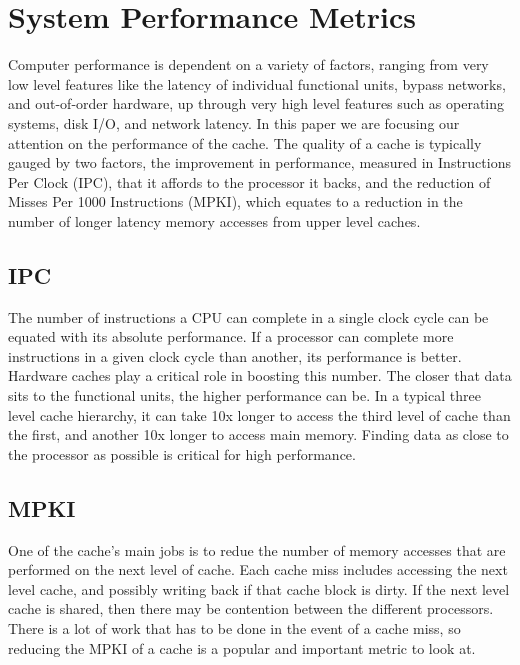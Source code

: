 \section{System Performance Metrics}

Computer performance is dependent on a variety of factors,
 ranging from very low level features like the latency of individual functional units,
 bypass networks, and out-of-order hardware, up through very high level features such as operating systems,
 disk I/O, and network latency. 
In this paper we are focusing our attention on the performance of the cache.
The quality of a cache is typically gauged by two factors,
 the improvement in performance, measured in Instructions Per Clock (IPC),
 that it affords to the processor it backs, and the reduction of Misses Per 1000 Instructions (MPKI),
 which equates to a reduction in the number of longer latency memory accesses from upper level caches.

\subsection{IPC}

The number of instructions a CPU can complete in a single clock cycle can be equated with its absolute performance.
If a processor can complete more instructions in a given clock cycle than another, its performance is better.
Hardware caches play a critical role in boosting this number.
The closer that data sits to the functional units, the higher performance can be.
In a typical three level cache hierarchy, it can take 10x longer to access the third level of cache than the first,
 and another 10x longer to access main memory.
Finding data as close to the processor as possible is critical for high performance.

\subsection{MPKI}

One of the cache's main jobs is to redue the number of memory accesses that are performed on the next level of cache.
Each cache miss includes accessing the next level cache, and possibly writing back if that cache block is dirty.
If the next level cache is shared, then there may be contention between the different processors.
There is a lot of work that has to be done in the event of a cache miss,
 so reducing the MPKI of a cache is a popular and important metric to look at.

